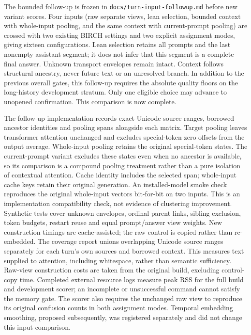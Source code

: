 \documentclass[11pt]{article}
\begin{document}
The bounded follow-up is frozen in \texttt{docs/turn-input-followup.md} before
new variant scores. Four inputs (raw separate views, lean selection, bounded
context with whole-input pooling, and the same context with current-prompt
pooling) are crossed with two existing BIRCH settings and two explicit
assignment modes, giving sixteen configurations. Lean selection retains all
prompts and the last nonempty assistant segment; it does not infer that this
segment is a complete final answer. Unknown transport envelopes remain intact.
Context follows structural ancestry, never future text or an unresolved branch.
In addition to the previous overall gates, this follow-up requires the absolute
quality floors on the long-history development stratum. Only one eligible
choice may advance to unopened confirmation. This comparison is now complete.

The follow-up implementation records exact Unicode source ranges, borrowed
ancestor identities and pooling spans alongside each matrix. Target pooling
leaves transformer attention unchanged and excludes special-token zero offsets
from the output average. Whole-input
pooling retains the original special-token states. The current-prompt variant
excludes these states even when no ancestor is available, so its comparison is
a compound pooling treatment rather than a pure isolation of contextual attention.
Cache identity includes the selected span; whole-input
cache keys retain their original generation. An installed-model smoke check
reproduces the original whole-input vectors bit-for-bit on two inputs. This is
an implementation compatibility check, not evidence of clustering improvement.
Synthetic tests cover unknown envelopes, ordinal parent links, sibling exclusion,
token budgets, restart reuse and equal prompt/answer view weights. New construction
timings are cache-assisted; the raw control is copied rather than re-embedded.
The coverage report unions overlapping Unicode source ranges separately for
each turn's own sources and borrowed context. This measures text supplied to
attention, including whitespace, rather than semantic sufficiency. Raw-view
construction costs are taken from the original build, excluding control-copy
time. Completed external resource logs measure peak RSS for the full build and
development scorer; an incomplete or unsuccessful command cannot satisfy the
memory gate. The scorer also requires the unchanged raw view to reproduce its
original confusion counts in both assignment modes.
Temporal embedding smoothing, proposed subsequently, was registered separately
and did not change this input comparison.
\end{document}

